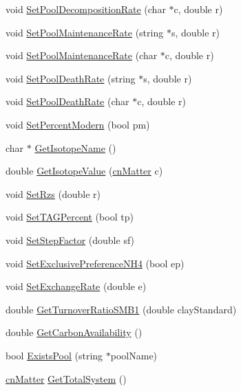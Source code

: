 \begin{DoxyCompactItemize}
void \hyperlink{classorganic_matter_a463254cfa0a5995d1d4e902f66a9f3ca}{SetPoolDecompositionRate} (char $\ast$c, double r)
\item 
void \hyperlink{classorganic_matter_a4d0b7d6e7cf64fdfccff6d0f4004d6d1}{SetPoolMaintenanceRate} (string $\ast$s, double r)
\item 
void \hyperlink{classorganic_matter_a0e6a78d76c751e8d0f614938170cff20}{SetPoolMaintenanceRate} (char $\ast$c, double r)
\item 
void \hyperlink{classorganic_matter_a9570bf4f0f840b7d661575d7bf62a964}{SetPoolDeathRate} (string $\ast$s, double r)
\item 
void \hyperlink{classorganic_matter_a320614cdcedb30be5562a96164b6002b}{SetPoolDeathRate} (char $\ast$c, double r)
\item 
void \hyperlink{classorganic_matter_ad506c445be08af7d10c7173f2ea5fe9c}{SetPercentModern} (bool pm)
\item 
char $\ast$ \hyperlink{classorganic_matter_a87f6c16bf53e782fd3be862f2acc40ae}{GetIsotopeName} ()
\item 
double \hyperlink{classorganic_matter_a61d7bd102ae877658b15b6e186b4b250}{GetIsotopeValue} (\hyperlink{classcn_matter}{cnMatter} c)
\item 
void \hyperlink{classorganic_matter_aa36b3c3476900a2160aaefdaa9be75ce}{SetRzs} (double r)
\item 
void \hyperlink{classorganic_matter_a2173970ef85445737548b25b64a40cdd}{SetTAGPercent} (bool tp)
\item 
void \hyperlink{classorganic_matter_ade566ec0fc948e8215e30f12c4905259}{SetStepFactor} (double sf)
\item 
void \hyperlink{classorganic_matter_a2ca7d6028136a0f472893028928ca8a1}{SetExclusivePreferenceNH4} (bool ep)
\item 
void \hyperlink{classorganic_matter_a3dd11964f9c983b37c88328c80a978c1}{SetExchangeRate} (double e)
\item 
double \hyperlink{classorganic_matter_a7f207a5cc9b81af56393be25209e0bde}{GetTurnoverRatioSMB1} (double clayStandard)
\item 
double \hyperlink{classorganic_matter_a110fb0a083dc7ae8a1f955d699204bee}{GetCarbonAvailability} ()
\item 
bool \hyperlink{classorganic_matter_a6e5333276577c7e3df1edfd76cd079f9}{ExistsPool} (string $\ast$poolName)
\item 
\hyperlink{classcn_matter}{cnMatter} \hyperlink{classorganic_matter_a0796a73dd50dd9cf1d97bf8a5de3d3a4}{GetTotalSystem} ()

\end{DoxyCompactItemize}
